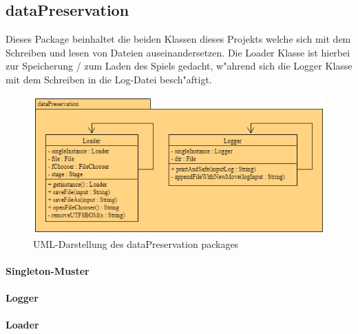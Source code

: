 \subsection{dataPreservation}
\label{ss:dataPreservation}
Dieses Package beinhaltet die beiden Klassen dieses Projekts welche sich mit dem Schreiben und lesen von Dateien auseinandersetzen. Die Loader Klasse ist hierbei zur Speicherung / zum Laden des Spiels gedacht, w"ahrend sich die Logger Klasse mit dem Schreiben in die Log-Datei besch"aftigt. 

\begin{figure}
	\centering
	\includegraphics{pics/dataPreservationPackage}
	\caption{UML-Darstellung des dataPreservation packages}
	\label{fig:dataPreservationPackage}
\end{figure}

\paragraph{Singleton-Muster}
\cite{Freeman2006}

\paragraph{Logger}
\label{par:logger}



\paragraph{Loader}
\label{par:loader}



